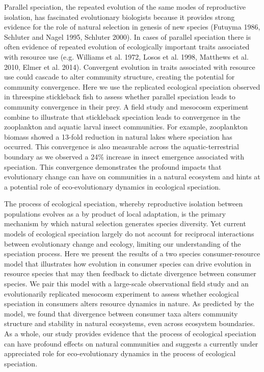 \documentclass[11pt]{article}
\begin{document}
Parallel speciation, the repeated evolution of the same modes of reproductive isolation, has fascinated evolutionary biologists because it provides strong evidence for the role of natural selection in genesis of new species (Futuyma 1986, Schluter and Nagel 1995, Schluter 2000).  In cases of parallel speciation there is often evidence of repeated evolution of ecologically important traits associated with resource use (e.g. Williams et al. 1972, Losos et al. 1998, Matthews et al. 2010, Elmer et al. 2014).  Convergent evolution in traits associated with resource use could cascade to alter community structure, creating the potential for community convergence.  Here we use the replicated ecological speciation observed in threespine stickleback fish to assess whether parallel speciation leads to community convergence in their prey.  A field study and mesocosm experiment combine to illustrate that stickleback speciation leads to convergence in the zooplankton and aquatic larval insect communities.  For example, zooplankton biomass showed a 13-fold reduction in natural lakes where speciation has occurred.  This convergence is also measurable across the aquatic-terrestrial boundary as we observed a 24\% increase in insect emergence associated with speciation.  This convergence demonstrates the profound impacts that evolutionary change can have on communities in a natural ecosystem and hints at a potential role of eco-evolutionary dynamics in ecological speciation.

The process of ecological speciation, whereby reproductive isolation between populations evolves as a by product of local adaptation, is the primary mechanism by which natural selection generates species diversity.  Yet current models of ecological speciation largely do not account for reciprocal interactions between evolutionary change and ecology, limiting our understanding of the speciation process.  Here we present the results of a two species consumer-resource model that illustrates how evolution in consumer species can drive evolution in resource species that may then feedback to dictate divergence between consumer species.  We pair this model with a large-scale observational field study and an evolutionarily replicated mesocosm experiment to assess whether ecological speciation in consumers alters resource dynamics in nature.  As predicted by the model, we found that divergence between consumer taxa alters community structure and stability in natural ecosystems, even across ecosystem boundaries.  As a whole, our study provides evidence that the process of ecological speciation can have profound effects on natural communities and suggests a currently under appreciated role for eco-evolutionary dynamics in the process of ecological speciation. 
\end{document}
